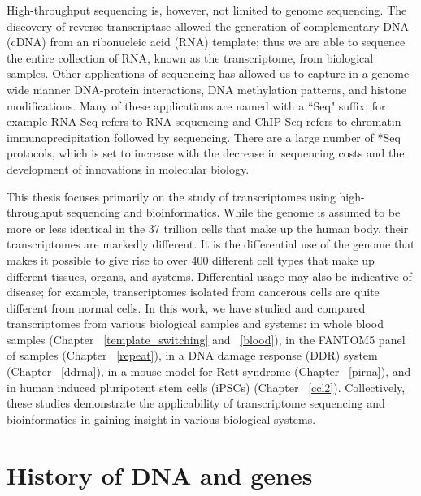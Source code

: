 High-throughput sequencing is, however, not limited to genome sequencing. The discovery of reverse transcriptase\cite{pmid4316300, pmid4316301} allowed the generation of complementary DNA (cDNA) from an ribonucleic acid (RNA) template; thus we are able to sequence the entire collection of RNA, known as the transcriptome, from biological samples. Other applications of sequencing has allowed us to capture in a genome-wide manner DNA-protein interactions, DNA methylation patterns, and histone modifications\cite{applicationsofsequencing}. Many of these applications are named with a ``Seq" suffix; for example RNA-Seq refers to RNA sequencing and ChIP-Seq refers to chromatin immunoprecipitation followed by sequencing. There are a large number of *Seq protocols\cite{pachter2014seq}, which is set to increase with the decrease in sequencing costs and the development of innovations in molecular biology.

This thesis focuses primarily on the study of transcriptomes using high-throughput sequencing and bioinformatics. While the genome is assumed to be more or less identical in the 37 trillion cells that make up the human body\cite{pmid23829164}, their transcriptomes are markedly different. It is the differential use of the genome that makes it possible to give rise to over 400 different cell types\cite{pmid16790079} that make up different tissues, organs, and systems. Differential usage may also be indicative of disease; for example, transcriptomes isolated from cancerous cells are quite different from normal cells. In this work, we have studied and compared transcriptomes from various biological samples and systems: in whole blood samples (Chapter ~\ref{template_switching} and ~\ref{blood}), in the FANTOM5 panel of samples (Chapter ~\ref{repeat}), in a DNA damage response (DDR) system (Chapter ~\ref{ddrna}), in a mouse model for Rett syndrome (Chapter ~\ref{pirna}), and in human induced pluripotent stem cells (iPSCs) (Chapter ~\ref{ccl2}). Collectively, these studies demonstrate the applicability of transcriptome sequencing and bioinformatics in gaining insight in various biological systems.

\section{History of DNA and genes}

